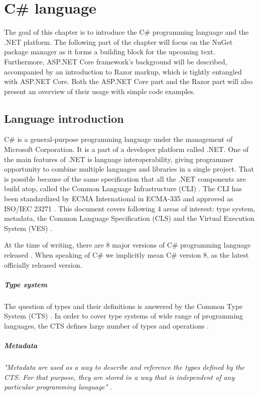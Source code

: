 \chapter{C\# language}
The goal of this chapter is to introduce the C\# programming language and the .NET platform. The following part of the chapter will focus on the NuGet package manager as it forms a building block for the upcoming text. Furthermore, ASP.NET Core framework's background will be described, accompanied by an introduction to Razor markup, which is tightly entangled with ASP.NET Core. Both the ASP.NET Core part and the Razor part will also present an overview of their usage with simple code examples.

\section{Language introduction}
C\# is a general-purpose programming language under the management of Microsoft Corporation. It is a part of a developer platform called .NET. One of the main features of .NET is language interoperability, giving programmer opportunity to combine multiple languages and libraries in a single project. That is possible because of the same specification that all the .NET components are build atop, called the Common Language Infrastructure (CLI) \citep{Ecma335}. The CLI has been standardized by ECMA International in ECMA-335 and approved as ISO/IEC 23271 \citep{Ecma335}. This document covers following 4 areas of interest: type system, metadata, the Common Language Specification (CLS) and the Virtual Execution System (VES) \citep{Ecma335}. 

At the time of writing, there are 8 major versions of C\# programming language released \citep{microsoft.docs}. When speaking of C\# we implicitly mean C\# version 8, as the latest officially released version.

\paragraph{Type system}
The question of types and their definitions is answered by the Common Type System (CTS) \citep{Ecma335}. In order to cover type systems of wide range of programming languages, the CTS defines large number of types and operations \citep{Ecma335}. 

\paragraph{Metadata}
\textit{"Metadata are used as a way to describe and reference the types defined by the CTS. For that purpose, they are stored in a way that is independent of any particular programming language"} \citep{Ecma335}.

